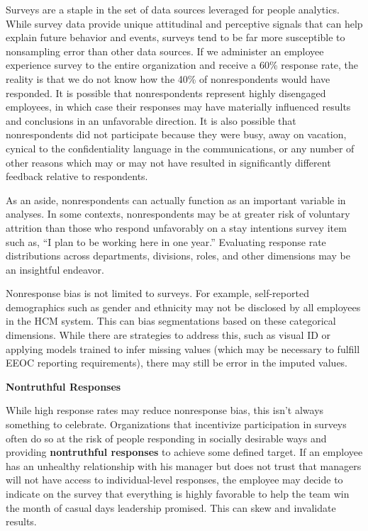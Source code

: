 \documentclass[
]{book}
\begin{document}
Surveys are a staple in the set of data sources leveraged for people analytics. While survey data provide unique attitudinal and perceptive signals that can help explain future behavior and events, surveys tend to be far more susceptible to nonsampling error than other data sources. If we administer an employee experience survey to the entire organization and receive a 60\% response rate, the reality is that we do not know how the 40\% of nonrespondents would have responded. It is possible that nonrespondents represent highly disengaged employees, in which case their responses may have materially influenced results and conclusions in an unfavorable direction. It is also possible that nonrespondents did not participate because they were busy, away on vacation, cynical to the confidentiality language in the communications, or any number of other reasons which may or may not have resulted in significantly different feedback relative to respondents.

As an aside, nonrespondents can actually function as an important variable in analyses. In some contexts, nonrespondents may be at greater risk of voluntary attrition than those who respond unfavorably on a stay intentions survey item such as, ``I plan to be working here in one year.'' Evaluating response rate distributions across departments, divisions, roles, and other dimensions may be an insightful endeavor.

Nonresponse bias is not limited to surveys. For example, self-reported demographics such as gender and ethnicity may not be disclosed by all employees in the HCM system. This can bias segmentations based on these categorical dimensions. While there are strategies to address this, such as visual ID or applying models trained to infer missing values (which may be necessary to fulfill EEOC reporting requirements), there may still be error in the imputed values.

\textbf{Nontruthful Responses}

While high response rates may reduce nonresponse bias, this isn't always something to celebrate. Organizations that incentivize participation in surveys often do so at the risk of people responding in socially desirable ways and providing \textbf{nontruthful responses} to achieve some defined target. If an employee has an unhealthy relationship with his manager but does not trust that managers will not have access to individual-level responses, the employee may decide to indicate on the survey that everything is highly favorable to help the team win the month of casual days leadership promised. This can skew and invalidate results.
\end{document}
